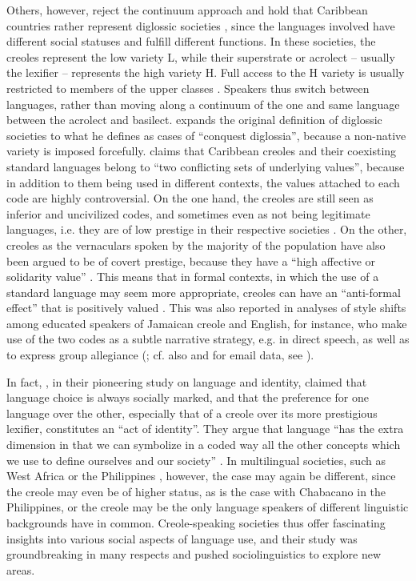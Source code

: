 \documentclass[output=paper,
modfonts
]{langscibook}
\begin{document}
Others, however, reject the continuum approach and hold that Caribbean countries rather represent diglossic societies \citep[cf.][]{ferguson1959diglossia}, since the languages involved have different social statuses and fulfill different functions. In these societies, the creoles represent the low variety L, while their superstrate or acrolect – usually the lexifier – represents the high variety H. Full access to the H variety is usually restricted to members of the upper classes \citep[cf.][]{winford1985concept}. Speakers thus switch between languages, rather than moving along a continuum of the one and same language between the acrolect and basilect. \cite{devonish2003language} expands the original definition of diglossic societies to what he defines as cases of “conquest diglossia”, because a non-native variety is imposed forcefully. \cite{winford1985concept} claims that Caribbean creoles and their coexisting standard languages belong to “two conflicting sets of underlying values”, because in addition to them being used in different contexts, the values attached to each code are highly controversial. On the one hand, the creoles are still seen as inferior and uncivilized codes, and sometimes even as not being legitimate languages, i.e. they are of low prestige in their respective societies \citep[cf.][]{rickfordetal1985symbol, patrick2008jamaican, kouwenbergetal2011linguistics}. On the other, creoles as the vernaculars spoken by the majority of the population have also been argued to be of covert prestige, because they have a “high affective or solidarity value” \citep[259]{rickfordetal1985symbol}. This means that in formal contexts, in which the use of a standard language may seem more appropriate, creoles can have an “anti-formal effect” that is positively valued \citep{allsopp1996dictionary}. This was also reported in analyses of style shifts among educated speakers of Jamaican creole and English, for instance, who make use of the two codes as a subtle narrative strategy, e.g. in direct speech, as well as to express group allegiance (\citealt{deuber2009english}; cf. also \citealt{patrick2008jamaican} and for email data, see \citealt{hinrichs2006code}).

In fact, \cite{lepageetal1985acts}, in their pioneering study on language and identity, claimed that language choice is always socially marked, and that the preference for one language over the other, especially that of a creole over its more prestigious lexifier, constitutes an “act of identity”. They argue that language “has the extra dimension in that we can symbolize in a coded way all the other concepts which we use to define ourselves and our society” \citep[247-248]{lepageetal1985acts}. In multilingual societies, such as West Africa \citep{yakpo2017towards} or the Philippines \citep{leshoetal2013sociolinguistic}, however, the case may again be different, since the creole may even be of higher status, as is the case with Chabacano in the Philippines, or the creole may be the only language speakers of different linguistic backgrounds have in common. Creole-speaking societies thus offer fascinating insights into various social aspects of language use, and their study was groundbreaking in many respects and pushed sociolinguistics to explore new areas.
\end{document}

